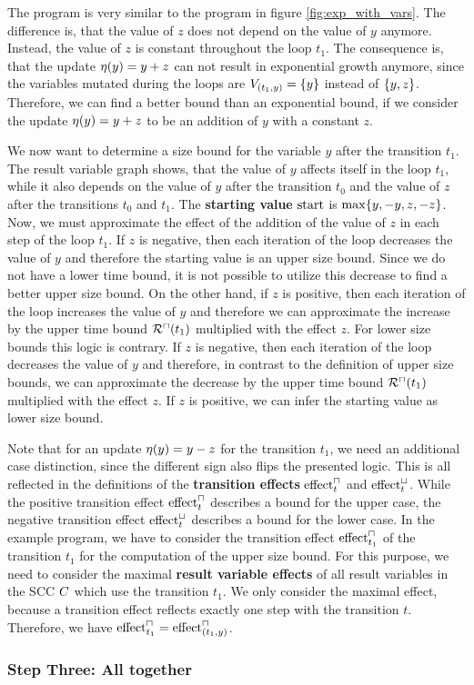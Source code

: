 

The program is very similar to the program in figure \ref{fig:exp_with_vars}.
The difference is, that the value of $z$ does not depend on the value of $y$ anymore.
Instead, the value of $z$ is constant throughout the loop $t_1$.
The consequence is, that the update $\eta(y) = y + z$ can not result in exponential growth anymore, since the variables mutated during the loops are $V_{(t_1,y)} = \lbrace y \rbrace$ instead of $\lbrace y,z \rbrace$.
Therefore, we can find a better bound than an exponential bound, if we consider the update $\eta(y) = y + z$ to be an addition of $y$ with a constant $z$.

We now want to determine a size bound for the variable $y$ after the transition $t_1$.
The result variable graph shows, that the value of $y$ affects itself in the loop $t_1$, while it also depends on the value of $y$ after the transition $t_0$ and the value of $z$ after the transitions $t_0$ and $t_1$.
The \textbf{starting value} $\text{start}$ is $\max \lbrace y,-y,z,-z \rbrace$.
Now, we must approximate the effect of the addition of the value of $z$ in each step of the loop $t_1$.
If $z$ is negative, then each iteration of the loop decreases the value of $y$ and therefore the starting value is an upper size bound.
Since we do not have a lower time bound, it is not possible to utilize this decrease to find a better upper size bound.
On the other hand, if $z$ is positive, then each iteration of the loop increases the value of $y$ and therefore we can approximate the increase by the upper time bound ${\mathcal{R}^\sqcap}(t_1)$ multiplied with the effect $z$.
For lower size bounds this logic is contrary.
If $z$ is negative, then each iteration of the loop decreases the value of $y$ and therefore, in contrast to the definition of upper size bounds, we can approximate the decrease by the upper time bound ${\mathcal{R}^\sqcap}(t_1)$ multiplied with the effect $z$.
If $z$ is positive, we can infer the starting value as lower size bound.

Note that for an update $\eta(y) = y - z$ for the transition $t_1$, we need an additional case distinction, since the different sign also flips the presented logic.
This is all reflected in the definitions of the \textbf{transition effects} $\text{effect}^\sqcap_t$ and $\text{effect}^\sqcup_t$.
While the positive transition effect $\text{effect}^\sqcap_t$ describes a bound for the upper case, the negative transition effect $\text{effect}^\sqcup_t$ describes a bound for the lower case.
In the example program, we have to consider the transition effect $\text{effect}^\sqcap_{t_1}$ of the transition $t_1$ for the computation of the upper size bound.
For this purpose, we need to consider the maximal \textbf{result variable effects} of all result variables in the SCC $C$ which use the transition $t_1$.
We only consider the maximal effect, because a transition effect reflects exactly one step with the transition $t$.
Therefore, we have $\text{effect}^\sqcap_{t_1} = \text{effect}^\sqcap_{(t_1,y)}$.


\subsubsection{Step Three: All together}


